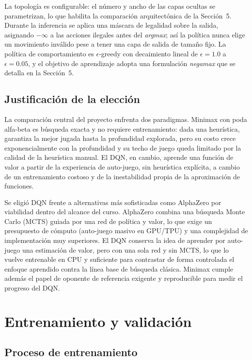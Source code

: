\documentclass[11pt,a4paper]{article}
\begin{document}
La topología es configurable: el número y ancho de las capas ocultas se parametrizan, lo que habilita la comparación arquitectónica de la Sección~5. Durante la inferencia se aplica una máscara de legalidad sobre la salida, asignando $-\infty$ a las acciones ilegales antes del \textit{argmax}; así la política nunca elige un movimiento inválido pese a tener una capa de salida de tamaño fijo. La política de comportamiento es $\epsilon$-greedy con decaimiento lineal de $\epsilon=1.0$ a $\epsilon=0.05$, y el objetivo de aprendizaje adopta una formulación \emph{negamax} que se detalla en la Sección~5.

\subsection{Justificación de la elección}

La comparación central del proyecto enfrenta dos paradigmas. Minimax con poda alfa-beta es búsqueda exacta y no requiere entrenamiento: dada una heurística, garantiza la mejor jugada hasta la profundidad explorada, pero su costo crece exponencialmente con la profundidad y su techo de juego queda limitado por la calidad de la heurística manual. El DQN, en cambio, aprende una función de valor a partir de la experiencia de auto-juego, sin heurística explícita, a cambio de un entrenamiento costoso y de la inestabilidad propia de la aproximación de funciones.

Se eligió DQN frente a alternativas más sofisticadas como AlphaZero por viabilidad dentro del alcance del curso. AlphaZero combina una búsqueda Monte Carlo (MCTS) guiada por una red de política y valor, lo que exige un presupuesto de cómputo (auto-juego masivo en GPU/TPU) y una complejidad de implementación muy superiores. El DQN conserva la idea de aprender por auto-juego una estimación de valor, pero con una sola red y sin MCTS, lo que lo vuelve entrenable en CPU y suficiente para contrastar de forma controlada el enfoque aprendido contra la línea base de búsqueda clásica. Minimax cumple además el papel de oponente de referencia exigente y reproducible para medir el progreso del DQN.

\section{Entrenamiento y validación}

\subsection{Proceso de entrenamiento}
\end{document}

